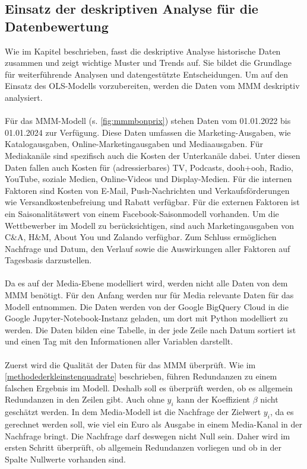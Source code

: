 \subsection{Einsatz der deskriptiven Analyse für die Datenbewertung}
Wie im Kapitel  beschrieben, fasst die deskriptive Analyse historische Daten zusammen und zeigt wichtige Muster und Trends auf. Sie bildet die Grundlage für weiterführende Analysen und datengestützte Entscheidungen. Um auf den Einsatz des \ac{OLS}-Modells vorzubereiten, werden die Daten vom \ac{MMM} deskriptiv analysiert. \\\\
Für das \ac{MMM}-Modell (s. \autoref{fig:mmmbonprix}) stehen Daten vom 01.01.2022 bis 01.01.2024 zur Verfügung. Diese Daten umfassen die Marketing-Ausgaben, wie Katalogausgaben, Online-Marketingausgaben und Mediaausgaben. Für Mediakanäle sind spezifisch auch die Kosten der Unterkanäle dabei. 
Unter diesen Daten fallen auch Kosten für (adressierbares) TV, Podcasts, \ac{dooh}+\ac{ooh}, Radio, YouTube, soziale Medien, Online-Videos und Display-Medien. Für die internen Faktoren sind Kosten von E-Mail, Push-Nachrichten und Verkaufsförderungen wie Versandkostenbefreiung und Rabatt verfügbar. Für die externen Faktoren ist ein Saisonalitätswert von einem Facebook-Saisonmodell vorhanden. Um die Wettbewerber im Modell zu berücksichtigen, sind auch Marketingausgaben von C\&A, H\&M, About You und Zalando verfügbar. Zum Schluss ermöglichen Nachfrage und Datum, den Verlauf sowie die Auswirkungen aller Faktoren auf Tagesbasis darzustellen. \\\\
Da es auf der Media-Ebene modelliert wird, werden nicht alle Daten von dem \ac{MMM} benötigt. Für den Anfang werden nur für Media relevante Daten für das Modell entnommen. Die Daten werden von der Google BigQuery Cloud in die Google Jupyter-Notebook-Instanz geladen, um dort mit Python modelliert zu werden. Die Daten bilden eine Tabelle, in der jede Zeile nach Datum sortiert ist und einen Tag mit den Informationen aller Variablen darstellt. \\\\
Zuerst wird die Qualität der Daten für das \ac{MMM} überprüft. Wie im \autoref{methodederkleinstenquadrate} beschrieben, führen Redundanzen zu einem falschen Ergebnis im Modell. Deshalb soll es überprüft werden, ob es allgemein Redundanzen in den Zeilen gibt. Auch ohne \(y_i\) kann der Koeffizient $\beta$ nicht geschätzt werden. In dem Media-Modell ist die Nachfrage der Zielwert \(y_i\), da es gerechnet werden soll, wie viel ein Euro als Ausgabe in einem Media-Kanal in der Nachfrage bringt. Die Nachfrage darf deswegen nicht Null sein. Daher wird im ersten Schritt überprüft, ob allgemein Redundanzen vorliegen und ob in der Spalte  Nullwerte vorhanden sind.\\\\
